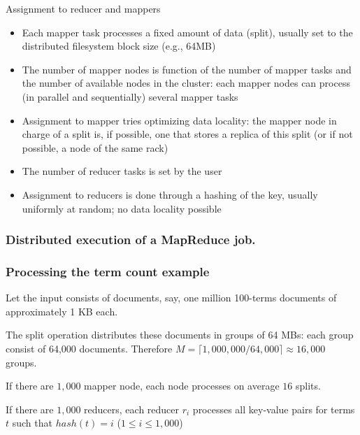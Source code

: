 \begin{frame}{Assignment to reducer and mappers}

\begin{itemize}
\item Each mapper task processes \alert{a fixed amount of data}
(\alert{split}),
usually set to
the distributed filesystem block size (e.g., 64MB)

\item The number of mapper nodes is function of the number of mapper
tasks and the number of available nodes in the cluster: each mapper nodes
can process (in parallel and sequentially) \alert{several mapper tasks}

\item Assignment to mapper tries optimizing \alert{data locality}: the
mapper node in charge of a split is, if possible, one that stores a
replica of this split (or if not possible, a node of the same rack)

\item The number of reducer tasks is \alert{set by the user}

\item Assignment to reducers is done through a hashing of the key, usually
\alert{uniformly at random}; no data locality possible
\end{itemize}

\end{frame}

\begin{frame}
\frametitle{Distributed execution of a MapReduce job.}


\end{frame}

\begin{frame}
\frametitle{Processing the term count example}

Let the input
consists of documents, say, one million 100-terms documents of approximately 1 KB each. 

\vfill

The split operation distributes these documents in groups of 64 MBs: each group
consist of 64,000 documents. Therefore $M= \lceil 1{,}000{,}000/64{,}000
\rceil \approx 16{,}000$
groups.

\vfill

If there are $1{,}000$ mapper node, each node processes on average $16$
splits.

\vfill

If there are $1{,}000$ reducers, each reducer $r_i$ processes 
all key-value pairs for terms $t$ such that
$\mathit{hash}(t)=i$ ($1\leq i\leq {1,000}$)

\end{frame}


